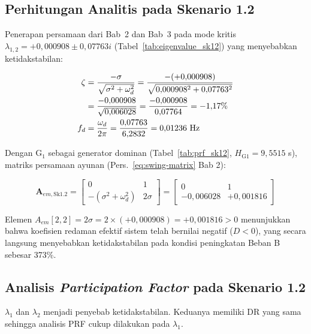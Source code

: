 \subsection{Perhitungan Analitis pada Skenario 1.2}

Penerapan persamaan dari Bab~2 dan Bab~3 pada mode kritis $\lambda_{1,2}
= +0{,}000908 \pm 0{,}07763i$ (Tabel~\ref{tab:eigenvalue_sk12}) yang menyebabkan
ketidakstabilan:

\begin{align}
    \zeta &= \frac{-\sigma}{\sqrt{\sigma^2 + \omega_d^2}}
           = \frac{-(+0{,}000908)}{\sqrt{0{,}000908^2 + 0{,}07763^2}} \notag \\
          &= \frac{-0{,}000908}{\sqrt{0{,}006028}}
           = \frac{-0{,}000908}{0{,}07764} = -1{,}17\% \\
    f_d   &= \frac{\omega_d}{2\pi} = \frac{0{,}07763}{6{,}2832} = 0{,}01236 \text{ Hz}
\end{align}

Dengan G$_1$ sebagai generator dominan (Tabel~\ref{tab:prf_sk12},
$H_{\text{G1}} = 9{,}5515$ s), matriks persamaan ayunan
(Pers.~\ref{eq:swing-matrix} Bab 2):

\begin{equation}
    \mathbf{A}_{em,\text{Sk1.2}} =
    \begin{bmatrix}
        0 & 1 \\[4pt]
        -(\sigma^2 + \omega_d^2) & 2\sigma
    \end{bmatrix}
    =
    \begin{bmatrix}
        0 & 1 \\[4pt]
        -0{,}006028 & +0{,}001816
    \end{bmatrix}
    \label{eq:Aem_sk12}
\end{equation}

Elemen $A_{em}[2,2] = 2\sigma = 2 \times (+0{,}000908) = +0{,}001816 > 0$
menunjukkan bahwa koefisien redaman efektif sistem telah bernilai negatif
($D < 0$), yang secara langsung menyebabkan ketidakstabilan pada kondisi
peningkatan Beban B sebesar 373\%.

\subsection{Analisis \textit{Participation Factor} pada Skenario 1.2}
\label{subsec:prf_sk12}

$\lambda_1$ dan $\lambda_2$ menjadi penyebab ketidakstabilan. Keduanya memiliki
DR yang sama sehingga analisis PRF cukup dilakukan pada $\lambda_1$.

